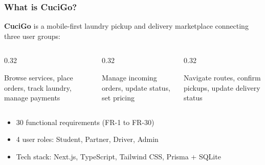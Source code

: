 \documentclass[aspectratio=169,professionalfonts,10pt]{beamer}
\begin{document}
\begin{frame}
    \frametitle{What is CuciGo?}
    \small
    \textbf{CuciGo} is a mobile-first laundry pickup and delivery marketplace connecting three user groups:

    \begin{columns}[T]
        \begin{column}{0.32\textwidth}
            \begin{tcolorbox}[colback=cucigoTeal!10,colframe=cucigoTeal,title=\centering\small Students]
                \scriptsize
                Browse services, place orders, track laundry, manage payments
            \end{tcolorbox}
        \end{column}

        \begin{column}{0.32\textwidth}
            \begin{tcolorbox}[colback=ugmBlue!10,colframe=ugmBlue,title=\centering\small Partners]
                \scriptsize
                Manage incoming orders, update status, set pricing
            \end{tcolorbox}
        \end{column}

        \begin{column}{0.32\textwidth}
            \begin{tcolorbox}[colback=cucigoCoral!10,colframe=cucigoCoral,title=\centering\small Drivers]
                \scriptsize
                Navigate routes, confirm pickups, update delivery status
            \end{tcolorbox}
        \end{column}
    \end{columns}

    \vspace{0.5em}
    \begin{tcolorbox}[colback=ugmLightGrey,colframe=ugmBlue,title=\small Key Facts]
        \scriptsize
        \begin{itemize}\setlength{\itemsep}{1pt}
            \item 30 functional requirements (FR-1 to FR-30)
            \item 4 user roles: Student, Partner, Driver, Admin
            \item Tech stack: Next.js, TypeScript, Tailwind CSS, Prisma + SQLite
        \end{itemize}
    \end{tcolorbox}
\end{frame}
\end{document}

